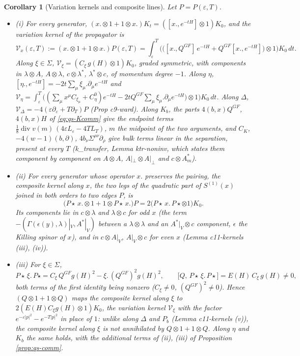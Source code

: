 \documentclass[11pt]{article}
\numberwithin{equation}{section}
\theoremstyle{plain}
\newtheorem{corollary}[theorem]{Corollary}
\theoremstyle{definition}
\newcommand{\Ap}{A|_{\perp}}
\newcommand{\AV}{A|_V}
\begin{document}
\begin{corollary}[Variation kernels and composite lines]
\label{cor:qs-edges}
Let $P=P(\varepsilon,T)$.
\begin{itemize}
\item (i) For every generator, $(x.\otimes1+1\otimes x.)K_t=([x.,e^{-tH}]\otimes1)K_0$, and the variation kernel of the propagator is
\[
\mathcal V_x(\varepsilon,T):=(x.\otimes1+1\otimes x.)P(\varepsilon,T)=\int_\varepsilon^T\Big(\big([x.,Q^{GF}]\,e^{-tH}+Q^{GF}[x.,e^{-tH}]\big)\otimes1\Big)K_0\,dt .
\]
Along $\xi\in\Sigma$, $\mathcal V_\xi=(C_\xi\,g(H)\otimes1)K_0$, graded symmetric, with components in $\lambda\otimes A$, $A\otimes\lambda$, $c\otimes\lambda^*$, $\lambda^*\otimes c$, of momentum degree $-1$. Along $\eta$, $[\eta.,e^{-tH}]=-2t\sum_\mu\xi_\mu.\partial_\mu e^{-tH}$ and $\mathcal V_\eta=\int_\varepsilon^T\big((\sum_\mu x^\mu C_{\xi_\mu}+C^0_\eta)e^{-tH}-2tQ^{GF}\sum_\mu\xi_\mu.\partial_\mu e^{-tH}\big)\otimes1\big)K_0\,dt$. Along $\Delta$, $\mathcal V_\Delta=-4(\varepsilon\partial_\varepsilon+T\partial_T)P$ (Prop c9-ward). Along $K_b$, the parts $4(b,x)Q^{GF}$, $4(b,x)H$ of \eqref{eq:qs-Kcomm} give the endpoint terms $\tfrac18\operatorname{div}v(m)\,(4\varepsilon L_\varepsilon-4TL_T)$, $m$ the midpoint of the two arguments, and $C_K$, $-4(w-1)(b,\partial)$, $4b_\nu\Sigma^{\rho\nu}\partial_\rho$ give bulk terms linear in the separation, present at every $T$ (k\_transfer, Lemma ktr-noninv, which states them component by component on $A\otimes A$, $\Ap\otimes\Ap$ and $c\otimes A^*_m$).
\item (ii) For every generator whose operator $x.$ preserves the pairing, the composite kernel along $x$, the two legs of the quadratic part of $S^{(1)}(x)$ joined in both orders to two edges $P$, is
\[
\big(P\star\,x.\otimes1+1\otimes P\star\,x.\big)P=2\big(P\star\,x.\,P\star\otimes1\big)K_0 .
\]
Its components lie in $c\otimes\lambda$ and $\lambda\otimes c$ for odd $x$ (the term $-(\Gamma(\epsilon(y),\lambda)|_V,A^*|_V)$ between a $\lambda\otimes\lambda$ and an $A^*|_V\otimes c$ component, $\epsilon$ the Killing spinor of $x$), and in $c\otimes\AV$, $\AV\otimes c$ for even $x$ (Lemma c11-kernels (iii), (iv)).
\item (iii) For $\xi\in\Sigma$,
\[
P\star\,\xi.\,P\star=C_\xi\,Q^{GF}g(H)^2-\xi.\,(Q^{GF})^2g(H)^2,\qquad \big[Q,\,P\star\,\xi.\,P\star\big]=E(H)\,C_\xi\,g(H)\neq0 ,
\]
both terms of the first identity being nonzero ($C_\xi\neq0$, $(Q^{GF})^2\neq0$). Hence $(Q\otimes1+1\otimes Q)$ maps the composite kernel along $\xi$ to $2(E(H)C_\xi g(H)\otimes1)K_0$, the variation kernel $\mathcal V_\xi$ with the factor $e^{-\varepsilon|p|^2}-e^{-T|p|^2}$ in place of $1$: unlike along $\Delta$ and $P_b$ (Lemma c11-kernels (v)), the composite kernel along $\xi$ is not annihilated by $Q\otimes1+1\otimes Q$. Along $\eta$ and $K_b$ the same holds, with the additional terms of (ii), (iii) of Proposition \ref{prop:qs-comm}.

\end{itemize}
\end{corollary}
\end{document}

